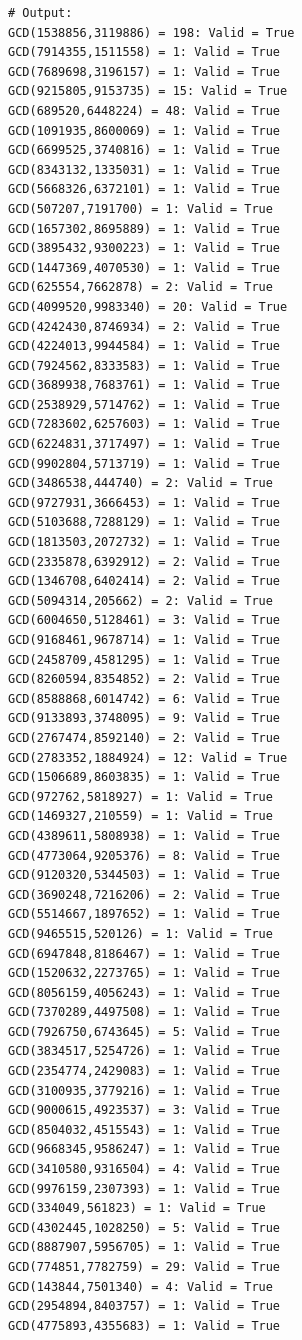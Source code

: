 \documentclass{article}
\begin{document}
\begin{enumerate}
\begin{enumerate}
\begin{lstlisting}
# Output:
GCD(1538856,3119886) = 198: Valid = True
GCD(7914355,1511558) = 1: Valid = True
GCD(7689698,3196157) = 1: Valid = True
GCD(9215805,9153735) = 15: Valid = True
GCD(689520,6448224) = 48: Valid = True
GCD(1091935,8600069) = 1: Valid = True
GCD(6699525,3740816) = 1: Valid = True
GCD(8343132,1335031) = 1: Valid = True
GCD(5668326,6372101) = 1: Valid = True
GCD(507207,7191700) = 1: Valid = True
GCD(1657302,8695889) = 1: Valid = True
GCD(3895432,9300223) = 1: Valid = True
GCD(1447369,4070530) = 1: Valid = True
GCD(625554,7662878) = 2: Valid = True
GCD(4099520,9983340) = 20: Valid = True
GCD(4242430,8746934) = 2: Valid = True
GCD(4224013,9944584) = 1: Valid = True
GCD(7924562,8333583) = 1: Valid = True
GCD(3689938,7683761) = 1: Valid = True
GCD(2538929,5714762) = 1: Valid = True
GCD(7283602,6257603) = 1: Valid = True
GCD(6224831,3717497) = 1: Valid = True
GCD(9902804,5713719) = 1: Valid = True
GCD(3486538,444740) = 2: Valid = True
GCD(9727931,3666453) = 1: Valid = True
GCD(5103688,7288129) = 1: Valid = True
GCD(1813503,2072732) = 1: Valid = True
GCD(2335878,6392912) = 2: Valid = True
GCD(1346708,6402414) = 2: Valid = True
GCD(5094314,205662) = 2: Valid = True
GCD(6004650,5128461) = 3: Valid = True
GCD(9168461,9678714) = 1: Valid = True
GCD(2458709,4581295) = 1: Valid = True
GCD(8260594,8354852) = 2: Valid = True
GCD(8588868,6014742) = 6: Valid = True
GCD(9133893,3748095) = 9: Valid = True
GCD(2767474,8592140) = 2: Valid = True
GCD(2783352,1884924) = 12: Valid = True
GCD(1506689,8603835) = 1: Valid = True
GCD(972762,5818927) = 1: Valid = True
GCD(1469327,210559) = 1: Valid = True
GCD(4389611,5808938) = 1: Valid = True
GCD(4773064,9205376) = 8: Valid = True
GCD(9120320,5344503) = 1: Valid = True
GCD(3690248,7216206) = 2: Valid = True
GCD(5514667,1897652) = 1: Valid = True
GCD(9465515,520126) = 1: Valid = True
GCD(6947848,8186467) = 1: Valid = True
GCD(1520632,2273765) = 1: Valid = True
GCD(8056159,4056243) = 1: Valid = True
GCD(7370289,4497508) = 1: Valid = True
GCD(7926750,6743645) = 5: Valid = True
GCD(3834517,5254726) = 1: Valid = True
GCD(2354774,2429083) = 1: Valid = True
GCD(3100935,3779216) = 1: Valid = True
GCD(9000615,4923537) = 3: Valid = True
GCD(8504032,4515543) = 1: Valid = True
GCD(9668345,9586247) = 1: Valid = True
GCD(3410580,9316504) = 4: Valid = True
GCD(9976159,2307393) = 1: Valid = True
GCD(334049,561823) = 1: Valid = True
GCD(4302445,1028250) = 5: Valid = True
GCD(8887907,5956705) = 1: Valid = True
GCD(774851,7782759) = 29: Valid = True
GCD(143844,7501340) = 4: Valid = True
GCD(2954894,8403757) = 1: Valid = True
GCD(4775893,4355683) = 1: Valid = True

\end{lstlisting}
\end{enumerate}
\end{enumerate}
\end{document}
